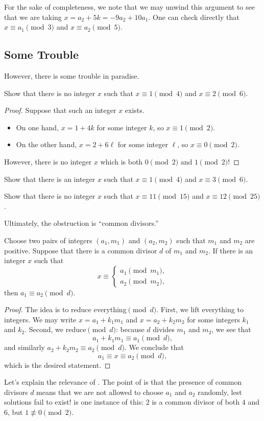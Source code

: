 \documentclass{article}
\begin{document}
\begin{remark} \label{rem:unwind-crt-mod-3-mod-5}
	For the sake of completeness, we note that we may unwind this argument to see that we are taking $x=a_2+5k=-9a_2+10a_1$. One can check directly that $x\equiv a_1\pmod3$ and $x\equiv a_2\pmod5$.
\end{remark}

\subsection{Some Trouble}
However, there is some trouble in paradise.
\begin{example} \label{ex:crt-nexist-ex}
	Show that there is no integer $x$ such that $x\equiv1\pmod4$ and $x\equiv2\pmod6$.
\end{example}
\begin{proof}
	Suppose that such an integer $x$ exists.
	\begin{itemize}
		\item On one hand, $x=1+4k$ for some integer $k$, so $x\equiv1\pmod2$.
		\item On the other hand, $x=2+6\ell$ for some integer $\ell$, so $x\equiv0\pmod2$.
	\end{itemize}
	However, there is no integer $x$ which is both $0\pmod2$ and $1\pmod2$!
\end{proof}
\begin{exe}
	Show that there is an integer $x$ such that $x\equiv1\pmod4$ and $x\equiv3\pmod6$.
\end{exe}
\begin{exe}
	Show that there is no integer $x$ such that $x\equiv11\pmod{15}$ and $x\equiv12\pmod{25}$.
\end{exe}
Ultimately, the obstruction is ``common divisors.''
\begin{proposition} \label{prop:crt-obstruction}
	Choose two pairs of integers $(a_1,m_1)$ and $(a_2,m_2)$ such that $m_1$ and $m_2$ are positive. Suppose that there is a common divisor $d$ of $m_1$ and $m_2$. If there is an integer $x$ such that
	\[x\equiv\begin{cases}
		a_1 \pmod{m_1}, \\
		a_2 \pmod{m_2},
	\end{cases}\]
	then $a_1\equiv a_2\pmod d$.
\end{proposition}
\begin{proof}
	The idea is to reduce everything$\pmod d$. First, we lift everything to integers. We may write $x=a_1+k_1m_1$ and $x=a_2+k_2m_2$ for some integers $k_1$ and $k_2$. Second, we reduce$\pmod d$: because $d$ divides $m_1$ and $m_2$, we see that
	\[a_1+k_1m_1\equiv a_1\pmod d,\]
	and similarly $a_2+k_2m_2\equiv a_2\pmod d$. We conclude that
	\[a_1\equiv x\equiv a_2\pmod d,\]
	which is the desired statement.
\end{proof}
\begin{remark}
	Let's explain the relevance of . The point of is that the presence of common divisors $d$ means that we are not allowed to choose $a_1$ and $a_2$ randomly, lest solutions fail to exist!  is one instance of this: $2$ is a common divisor of both $4$ and $6$, but $1\not\equiv0\pmod2$.
\end{remark}
\end{document}
